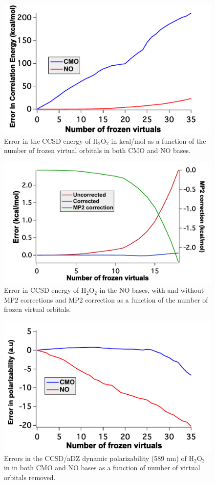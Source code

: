 \begin{figure}
  \centering
  \includegraphics[width=0.7\linewidth]{figures/energy.pdf}
  \caption{Error in the CCSD energy of H$_2$O$_2$ in kcal/mol as a 
           function of the number of frozen virtual orbitals in both CMO and NO bases.} 
  \label{fig:energy}
\end{figure}
\begin{figure}
  \centering
  \includegraphics[width=0.7\linewidth]{figures/Mp2c.pdf}
  \caption{Error in CCSD energy of H$_2$O$_2$ in the NO bases, with and without MP2 corrections 
        and MP2 correction as a function of the number of frozen virtual orbitals.}
\label{fig:MP2_corr}
\end{figure}
\begin{figure}
  \centering
  \includegraphics[width=0.6\linewidth]{figures/h2o2_polar.pdf}
  \caption{Errors in the CCSD/aDZ dynamic polarizability (589
nm) of H$_2$O$_2$ in 
       in both CMO and NO bases as a function of number of virtual orbitals removed.}
   \label{fig:polar_h2o2}
\end{figure}
